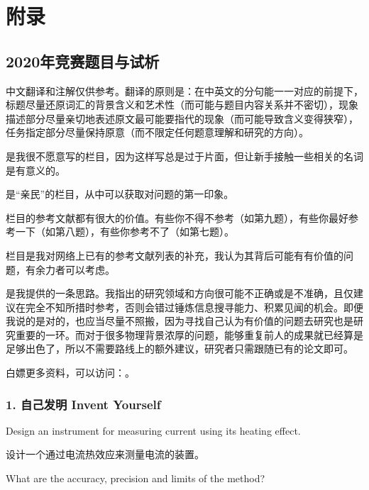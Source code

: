 \documentclass[a4paper,10pt,english]{sphinxmanual}
\begin{document}


\chapter{附录}
\label{\detokenize{7. Appendix:id1}}\label{\detokenize{7. Appendix::doc}}

\section{2020年竞赛题目与试析}
\label{\detokenize{7. Appendix:id2}}
中文翻译和注解仅供参考。翻译的原则是：在中英文的分句能一一对应的前提下，标题尽量还原词汇的背景含义和艺术性（而可能与题目内容关系并不密切），现象描述部分尽量亲切地表述原文最可能要指代的现象（而可能导致含义变得狭窄），任务指定部分尽量保持原意（而不限定任何题意理解和研究的方向）。

 是我很不愿意写的栏目，因为这样写总是过于片面，但让新手接触一些相关的名词是有意义的。

 是“亲民”的栏目，从中可以获取对问题的第一印象。

 栏目的参考文献都有很大的价值。有些你不得不参考（如第九题），有些你最好参考一下（如第八题），有些你参考不了（如第七题）。

 栏目是我对网络上已有的参考文献列表的补充，我认为其背后可能有有价值的问题，有余力者可以考虑。

 是我提供的一条思路。我指出的研究领域和方向很可能不正确或是不准确，且仅建议在完全不知所措时参考，否则会错过锤炼信息搜寻能力、积累见闻的机会。即便我说的是对的，也应当尽量不照搬，因为寻找自己认为有价值的问题去研究也是研究重要的一环。而对于很多物理背景浓厚的问题，能够重复前人的成果就已经算是足够出色了，所以不需要路线上的额外建议，研究者只需跟随已有的论文即可。

白嫖更多资料，可以访问：。


\subsection{1. 自己发明 Invent Yourself}
\label{\detokenize{7. Appendix:invent-yourself}}
Design an instrument for measuring current using its heating effect.

设计一个通过电流热效应来测量电流的装置。

What are the accuracy, precision and limits of the method?
\end{document}
